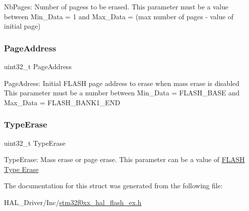 Nb\+Pages\+: Number of pagess to be erased. This parameter must be a value between Min\+\_\+\+Data = 1 and Max\+\_\+\+Data = (max number of pages -\/ value of initial page) \mbox{\label{struct_f_l_a_s_h___erase_init_type_def_ac0d6c69c326b962d7748bf477c235b00}} 
\subsubsection{\texorpdfstring{Page\+Address}{PageAddress}}
{\footnotesize\ttfamily uint32\+\_\+t Page\+Address}

Page\+Adress\+: Initial F\+L\+A\+SH page address to erase when mass erase is disabled This parameter must be a number between Min\+\_\+\+Data = F\+L\+A\+S\+H\+\_\+\+B\+A\+SE and Max\+\_\+\+Data = F\+L\+A\+S\+H\+\_\+\+B\+A\+N\+K1\+\_\+\+E\+ND \mbox{\label{struct_f_l_a_s_h___erase_init_type_def_ae2154c09320f3ef7feb8f4a84e9ac17b}} 
\subsubsection{\texorpdfstring{Type\+Erase}{TypeErase}}
{\footnotesize\ttfamily uint32\+\_\+t Type\+Erase}

Type\+Erase\+: Mass erase or page erase. This parameter can be a value of \hyperlink{group___f_l_a_s_h_ex___type___erase}{F\+L\+A\+SH Type Erase} 

The documentation for this struct was generated from the following file\+:\begin{DoxyCompactItemize}
\item 
H\+A\+L\+\_\+\+Driver/\+Inc/\hyperlink{stm32f0xx__hal__flash__ex_8h}{stm32f0xx\+\_\+hal\+\_\+flash\+\_\+ex.\+h}\end{DoxyCompactItemize}
